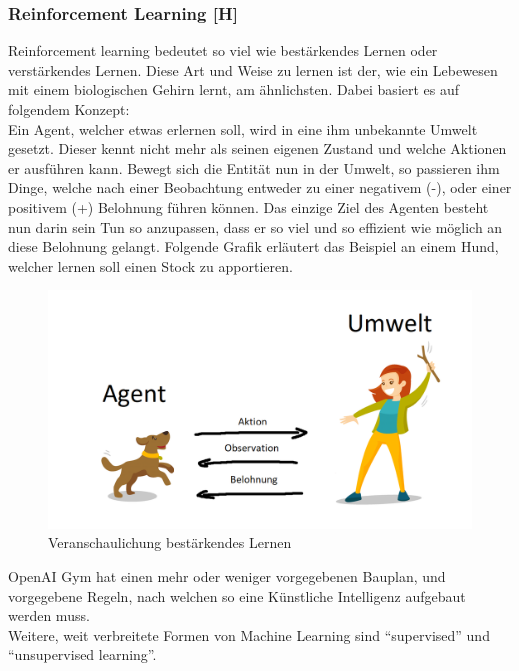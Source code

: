 \subsubsection{Reinforcement Learning [H]}\label{tech:reinfLearning:header}
Reinforcement learning bedeutet so viel wie bestärkendes Lernen oder verstärkendes Lernen.
Diese Art und Weise zu lernen ist der, wie ein Lebewesen mit einem biologischen Gehirn
lernt, am ähnlichsten.
Dabei basiert es auf folgendem Konzept: \\
Ein Agent, welcher etwas erlernen soll, wird in eine ihm unbekannte Umwelt gesetzt. Dieser kennt nicht mehr
als seinen eigenen Zustand und welche Aktionen er ausführen kann. Bewegt sich die Entität nun in der
Umwelt, so passieren ihm Dinge, welche nach einer Beobachtung entweder zu einer negativem (-), oder einer
positivem (+) Belohnung führen können. Das einzige Ziel des Agenten besteht nun darin sein Tun so anzupassen, dass
er so viel und so
effizient wie möglich an diese Belohnung gelangt. Folgende Grafik erläutert das Beispiel an einem Hund,
welcher lernen soll einen Stock zu apportieren.

\begin{figure}[H]
  \centering
  \includegraphics[scale=0.4]{pics/reinforcementLearningConcept.png}
  \caption{Veranschaulichung bestärkendes Lernen \cite{tech:reinforcementlearningDog:cite}}
  \label{tech:fig:reinfconcept}
\end{figure}

OpenAI Gym hat einen mehr oder weniger vorgegebenen Bauplan, und vorgegebene Regeln, nach welchen
so eine Künstliche Intelligenz aufgebaut werden muss. \\
Weitere, weit verbreitete Formen von Machine Learning sind ``supervised'' und ``unsupervised learning''.

